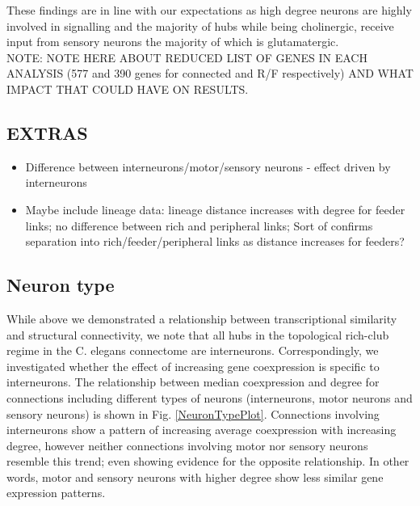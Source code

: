 \documentclass[10pt,letterpaper]{article}
\begin{document}
These findings are in line with our expectations as high degree neurons are highly involved in signalling and the majority of hubs while being cholinergic, receive input from sensory neurons the majority of which is glutamatergic. \\
NOTE: NOTE HERE ABOUT REDUCED LIST OF GENES IN EACH ANALYSIS (577 and 390 genes for connected and R/F respectively) AND WHAT IMPACT THAT COULD HAVE ON RESULTS.

\subsection*{EXTRAS}
\begin{itemize}
    \item{Difference between interneurons/motor/sensory neurons - effect driven by interneurons}
    \item{Maybe include lineage data: lineage distance increases with degree for feeder links; no difference between rich and peripheral links; Sort of confirms separation into rich/feeder/peripheral links as distance increases for feeders?}
\end{itemize}
\subsection*{Neuron type}
While above we demonstrated a relationship between transcriptional similarity and structural connectivity, we note that all hubs in the topological rich-club regime in the C. elegans connectome are interneurons.
Correspondingly, we investigated whether the effect of increasing gene coexpression is specific to interneurons.
The relationship between median coexpression and degree for connections including different types of neurons (interneurons, motor neurons and sensory neurons) is shown in Fig. \ref{NeuronTypePlot}.
Connections involving interneurons show a pattern of increasing average coexpression with increasing degree, however neither connections involving motor nor sensory neurons resemble this trend; even showing evidence for the opposite relationship.
In other words, motor and sensory neurons with higher degree show less similar gene expression patterns.
\end{document}
